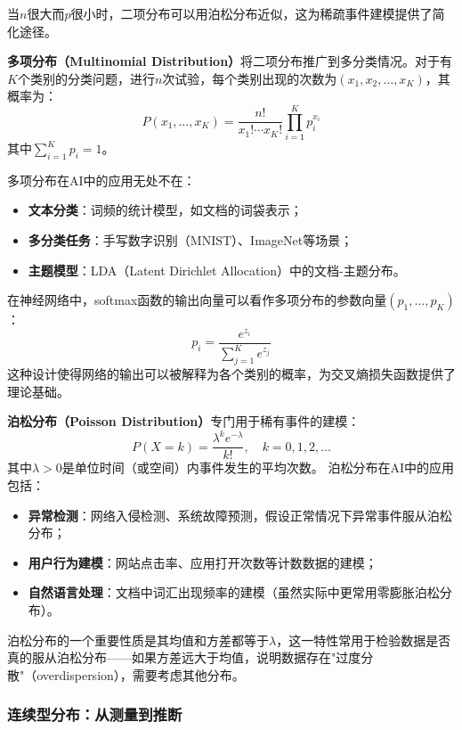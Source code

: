 当$n$很大而$p$很小时，二项分布可以用泊松分布近似，这为稀疏事件建模提供了简化途径。

\textbf{多项分布（Multinomial Distribution）}将二项分布推广到多分类情况。对于有$K$个类别的分类问题，进行$n$次试验，每个类别出现的次数为$(x_1, x_2, \ldots, x_K)$，其概率为：
\begin{equation}
P(x_1, \ldots, x_K) = \frac{n!}{x_1!\cdots x_K!}\prod_{i=1}^K p_i^{x_i}
\end{equation}
其中$\sum_{i=1}^K p_i = 1$。

多项分布在AI中的应用无处不在：
\begin{itemize}
  \item \textbf{文本分类}：词频的统计模型，如文档的词袋表示；
  \item \textbf{多分类任务}：手写数字识别（MNIST）、ImageNet等场景；
  \item \textbf{主题模型}：LDA（Latent Dirichlet Allocation）中的文档-主题分布。
\end{itemize}

在神经网络中，softmax函数的输出向量可以看作多项分布的参数向量$(p_1, \ldots, p_K)$：
\begin{equation}
p_i = \frac{e^{z_i}}{\sum_{j=1}^K e^{z_j}}
\end{equation}
这种设计使得网络的输出可以被解释为各个类别的概率，为交叉熵损失函数提供了理论基础。

\textbf{泊松分布（Poisson Distribution）}专门用于稀有事件的建模：
\begin{equation}
P(X=k) = \frac{\lambda^k e^{-\lambda}}{k!}, \quad k = 0, 1, 2, \ldots
\end{equation}
其中$\lambda > 0$是单位时间（或空间）内事件发生的平均次数。
泊松分布在AI中的应用包括：
\begin{itemize}
  \item \textbf{异常检测}：网络入侵检测、系统故障预测，假设正常情况下异常事件服从泊松分布；
  \item \textbf{用户行为建模}：网站点击率、应用打开次数等计数数据的建模；
  \item \textbf{自然语言处理}：文档中词汇出现频率的建模（虽然实际中更常用零膨胀泊松分布）。
\end{itemize}

泊松分布的一个重要性质是其均值和方差都等于$\lambda$，这一特性常用于检验数据是否真的服从泊松分布——如果方差远大于均值，说明数据存在"过度分散"（overdispersion），需要考虑其他分布。

\subsubsection{连续型分布：从测量到推断}

